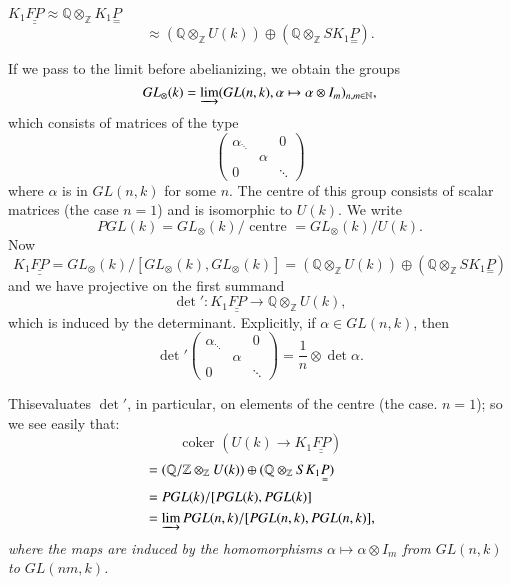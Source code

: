 \setcounter{theorem}{6}
\begin{theorem}%
$K_1 \underline{\underline{FP}} \approx \mathbb{Q} \otimes_{\mathbb{Z}} K_1
  \underset{=}{P}$\pageoriginale  
$$
\approx(\mathbb{Q} \otimes_{\mathbb{Z}} U(k)) \oplus (\mathbb{Q}
\otimes_{\mathbb{Z}} SK_1 \underset{=}{P}). 
$$ 
\end{theorem}

If we pass to the limit before abelianizing, we obtain the groups
$$
GL_{\otimes}(k) = \varinjlim (GL(n,k), \alpha \mapsto \alpha \otimes
I_m )_{n,m \in \mathbb{N}}, 
$$
which consists of matrices of the type 
$$
\begin{pmatrix}
\alpha_{ \ddots} && 0 \\ 
& \alpha\\ 
0 && \ddots
\end{pmatrix}
$$
where $\alpha$ is in $GL(n,k)$ for some $n$.  The centre of this group
consists of scalar matrices (the case $n=1$) and is isomorphic to
$U(k)$. We write 
$$
PGL(k) = GL_{\otimes}(k)/ \text{ centre } = GL_{\otimes}(k) / U(k). 
$$
Now
$$
K_1 \underline{\underline{FP}} = GL_\otimes (k) / [GL_\otimes (k),
  GL_\otimes (k)] = (\mathbb{Q} \otimes_{\mathbb{Z}} U(k)) \oplus
(\mathbb{Q} \otimes_{\mathbb{Z}} SK_1 \underset{=}{P})  
$$
and we have projective on the first summand
$$
{\det}' : K_1 \underline{\underline{FP}} \to \mathbb{Q}
\otimes_{\mathbb{Z}} U(k),   
$$
which is induced by the determinant. Explicitly, if $\alpha \in GL
(n,k)$, then 
$$
{\det}' \begin{pmatrix}
\alpha_{ \ddots} && 0 \\ & \alpha\\ 0 && \ddots
\end{pmatrix} = \frac{1}{n} \otimes \det \alpha.
$$

This\pageoriginale evaluates ${\det}'$, in particular, on elements of
the centre (the case. $n=1$); so we see easily that: 
\begin{equation*}
 \text{ coker } (U(k) \to K_1 \underline{\underline{FP}}) \tag{6.8}\label{eq6.8}
\end{equation*}
\begin{align*}
&=  (\mathbb{Q} / \mathbb{Z} \otimes_{\mathbb{Z}} U(k)) \oplus (\mathbb{Q}
  \otimes_{\mathbb{Z}} SK_1 \underset{=}{P})\\ 
&=  PGL(k) / [PGL(k), PGL (k)] \\
&= \varinjlim  PGL (n,k) / [PGL(n,k), PGL (n,k)],
\end{align*}
\textit{where the maps are induced by the homomorphisms $\alpha
\mapsto \alpha \otimes I_m$ from $GL(n,k)$ to
$GL(nm,k)$.} 


